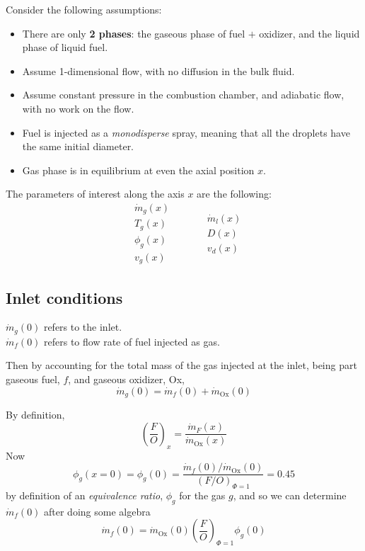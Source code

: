 \documentclass[10pt]{amsart}
\begin{document}
\begin{multicols*}{2}
Consider the following assumptions:
\begin{itemize}
\item There are only \textbf{2 phases}: the gaseous phase of fuel $+$ oxidizer, and the liquid phase of liquid fuel.
\item Assume 1-dimensional flow, with no diffusion in the bulk fluid.  
\item Assume constant pressure in the combustion chamber, and adiabatic flow, with no work on the flow.  
\item Fuel is injected as a \emph{monodisperse} spray, meaning that all the droplets have the same initial diameter.
\item Gas phase is in equilibrium at even the axial position $x$.  
\end{itemize}

The parameters of interest along the axis $x$ are the following:
\[
\begin{aligned}
  & \dot{m}_g(x) \\ 
  & T_g(x) \\
  & \phi_g(x) \\
  & v_g(x) 
\end{aligned} \quad \quad \, \begin{aligned}
  &  \dot{m}_l(x) \\
  &  D(x) \\
  & v_d(x)
\end{aligned}
\]

\subsection{Inlet conditions}

$\dot{m}_g(0)$ refers to the inlet.  \\
$\dot{m}_f(0)$ refers to flow rate of fuel injected as gas. 

Then by accounting for the total mass of the gas injected at the inlet, being part gaseous fuel, $f$, and gaseous oxidizer, Ox,
\[
\dot{m}_g(0) = \dot{m}_f(0) + \dot{m}_{\text{Ox}}(0)
\]

By definition,
\[
\left( \frac{ F}{O} \right)_x = \frac{ \dot{m}_F(x) }{ \dot{m}_{\text{Ox}}(x) }
\]
Now
\[
\phi_g(x=0) = \phi_g(0) = \frac{ \dot{m}_f(0) / \dot{m}_{\text{Ox}}(0) }{ (F/O)_{ \Phi=1} } = 0.45 
\]
by definition of an \emph{equivalence ratio}, $\phi_g$ for the gas $g$, and so we can determine $\dot{m}_f(0)$ after doing some algebra
\begin{equation}\label{Eq:dotm_f_from_phi_g}
\dot{m}_f(0) = \dot{m}_{\text{Ox}}(0) \left( \frac{F}{O} \right)_{\Phi=1} \phi_g(0)
\end{equation}


\end{multicols*}
\end{document}
